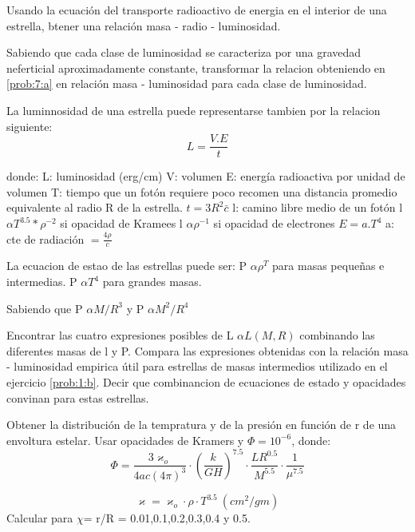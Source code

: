 \documentclass[12pt,a4paper]{practice}
\begin{document}
    \begin{problem}\label{prob:7}
        \begin{ppart}\label{prob:7:a}
        Usando la ecuación del transporte radioactivo de energia en el interior de una estrella, btener una relación masa - radio - luminosidad.
        \end{ppart}

        \begin{ppart}\label{prob:7:b}
        Sabiendo que cada clase de luminosidad se caracteriza por una gravedad neferticial aproximadamente constante, transformar la relacion obteniendo en \ref{prob:7:a} en relación masa - luminosidad para cada clase de luminosidad.
        \end{ppart}
    \end{problem}

    \begin{problem}\label{prob:8}
    La luminnosidad de una estrella puede representarse tambien por la relacion siguiente:
            $$
            L = \frac{V.E}{t}
            $$

        donde:  L: luminosidad (erg/cm)
                V: volumen
                E: energía radioactiva por unidad de volumen
                T: tiempo que un fotón requiere poco recomen una distancia promedio equivalente al radio R de la estrella.
        $t= 3R^{2}\bar c$
        l: camino libre medio de un fotón
        l $\alpha T^{3.5}* \rho^{-2}$ si opacidad de Kramees
        l $\alpha \rho^{-1}$ si opacidad de electrones
        $E = a.T^{4}$   a: cte de radiación $= \frac{4 \rho}{c} $

        La ecuacion de estao de las estrellas puede ser:
        P $\alpha \rho^{T}$ para masas pequeñas e intermedias.
        P $\alpha T^{4}$ para grandes masas.

        Sabiendo que
        P $\alpha M/R^{3}$ y P $\alpha M^{2}/R^{4}$

    Encontrar las cuatro expresiones posibles de L $\alpha L(M,R)$ combinando las diferentes masas de l y P. Compara las expresiones obtenidas con la relación masa - luminosidad empirica útil para estrellas de masas intermedios utilizado en el ejercicio \ref{prob:1:b}.  Decir que combinancion de ecuaciones de estado y opacidades convinan para estas estrellas.
    \end{problem}

    \begin{problem}\label{prob:9}
    Obtener la distribución de la tempratura y de la presión en función de r de una envoltura estelar. Usar opacidades de Kramers y $\Phi = 10^{-6}$, donde:
    $$
        \Phi = \frac{3 \varkappa_o}{4ac(4\pi)^{3}}\cdot \left(\frac{k}{GH}\right)^{7.5}\cdot \frac{LR^{0.5}}{M^{5.5}}\cdot \frac{1}{\mu^{7.5}}
    $$

    $$
        \varkappa = \varkappa_o \cdot \rho\cdot T^{3.5}\ (cm^{2}/ gm)
    $$
    Calcular para $\chi$= r/R = 0.01,0.1,0.2,0.3,0.4 y 0.5.

    \end{problem}
\end{document}

